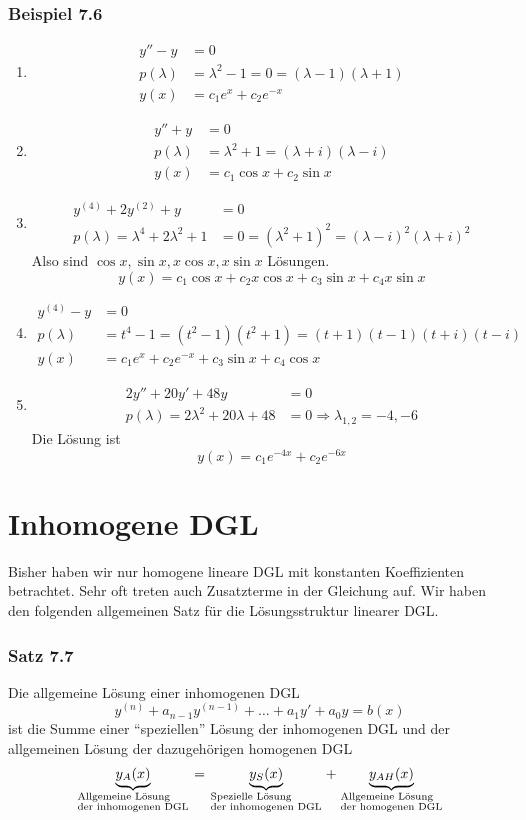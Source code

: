 \subsubsection*{Beispiel 7.6}
\begin{enumerate}
\item \begin{align*}
y''-y&=0\\
p(\lambda)&=\lambda^2-1=0=(\lambda-1)(\lambda+1)\\
y(x)&=c_1e^x+c_2e^{-x}
\end{align*}
\item 
\begin{align*}
y''+y&=0\\
p(\lambda)&=\lambda^2+1=(\lambda+i)(\lambda-i)\\
y(x)&=c_1\cos x+c_2\sin x
\end{align*}
\item 
\begin{align*}
y^{(4)}+2y^{(2)}+y&=0\\
p(\lambda)=\lambda^4+2\lambda^2+1&=0=(\lambda^2+1)^2=(\lambda-i)^2(\lambda+i)^2
\end{align*}
Also sind $\cos x, \sin x, x\cos x,x\sin x$ Lösungen. \[y(x)=c_1\cos x+c_2 x\cos x+c_3\sin x+c_4 x\sin x\]
\item \begin{align*}
y^{(4)}-y&=0\\
p(\lambda)&=t^4-1=(t^2-1)(t^2+1)=(t+1)(t-1)(t+i)(t-i)\\
y(x)&=c_1e^x+c_2e^{-x}+c_3\sin x+c_4\cos x
\end{align*}
\item \begin{align*}
2y''+20y'+48y&=0\\
p(\lambda)=2\lambda^2 +20\lambda+48&=0\Rightarrow \lambda_{1,2}=-4,-6
\end{align*}
Die Lösung ist \[y(x)=c_1e^{-4x}+c_2e^{-6x}\]
\end{enumerate}
\section{Inhomogene DGL}
Bisher haben wir nur homogene lineare DGL mit konstanten Koeffizienten betrachtet. Sehr oft treten auch Zusatzterme in der Gleichung auf. Wir haben den folgenden allgemeinen Satz für die Lösungsstruktur linearer DGL.
\subsubsection*{Satz 7.7}
Die allgemeine Lösung einer inhomogenen DGL \[y^{(n)}+a_{n-1}y^{(n-1)}+\dots +a_1y'+a_0y=b(x)\] ist die Summe einer ``speziellen'' Lösung der inhomogenen DGL und der allgemeinen Lösung der dazugehörigen homogenen DGL $$\underbrace {{y_A}(x)}_{\scriptstyle{\text{Allgemeine Lösung }}\hfill\atop
\scriptstyle{\text{der inhomogenen DGL}}\hfill} = \underbrace {{y_S}(x)}_{\scriptstyle{\text{Spezielle Lösung }}\hfill\atop
\scriptstyle{\text{der inhomogenen DGL}}\hfill} + \underbrace {{y_{AH}}(x)}_{\scriptstyle{\text{Allgemeine Lösung }}\hfill\atop
\scriptstyle{\text{der homogenen DGL}}\hfill}$$
